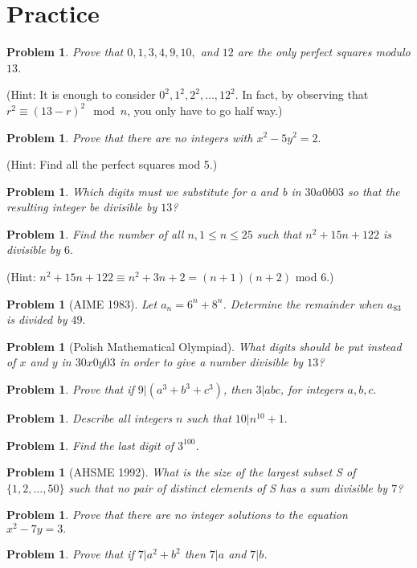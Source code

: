 \documentclass[11pt, openany]{book}
\theoremstyle{change} \theoremheaderfont{\blue\sffamily\bfseries}
\newtheorem{pro}[thm]{Problem}
\theoremstyle{nonumberplain} \theoremheaderfont{\sffamily\bfseries}
\newcommand{\í}{\'{\i}}
\begin{document}
\section*{Practice}\begin{multicols}{2}\columnseprule 1pt \columnsep 25pt

\begin{pro} Prove that $0, 1, 3, 4, 9, 10,$ and $12$ are the only perfect squares
modulo $13$.  \end{pro} (Hint: It is enough to consider $0^2, 1^2,
2^2, \ldots , 12^2$. In fact, by observing that $r^2 \equiv (13 -
r)^2 \mod n$, you only have to go half way.)
\begin{pro} Prove that there are no
integers with $x^2 - 5y^2 = 2.$ \end{pro} (Hint: Find all the
perfect squares mod 5.)
\begin{pro}Which digits must we substitute for a and b in $30a0b03$ so that the resulting
integer be divisible by $13$?\end{pro}

\begin{pro}  Find the number of all $n, 1 \leq n \leq 25$
such that $n^2 + 15n + 122$ is divisible by $6.$
\end{pro}(Hint: $n^2 + 15n + 122 \equiv n^2 + 3n + 2 = (n + 1)(n + 2)$ mod 6.)


\begin{pro}[AIME 1983] Let $a_n = 6^n + 8^n$. Determine the remainder
when $a_{83}$ is divided by $49.$ \end{pro}
\begin{pro}[Polish Mathematical Olympiad] What digits should be put instead of $x$ and $y$
in $30x0y03$ in order to give a number divisible by $13$?\end{pro}
\begin{pro} Prove that if $9|(a^3 + b^3 + c^3)$, then $3|abc$, for
integers $a, b, c.$ \end{pro}
\begin{pro}Describe all integers $n$ such that $10|n^{10} + 1.$\end{pro}
\begin{pro} Find the last digit of $3^{100}$. \end{pro}
\begin{pro}[AHSME 1992] What is the size of the largest
subset S of $\{ 1, 2, \ldots , 50\}$ such that no pair of distinct
elements of S has a sum divisible by $7$?\end{pro}
\begin{pro} Prove that there are no integer solutions to the equation $x^2 - 7y = 3.$ \end{pro}
\begin{pro} Prove that if $7|a^2 + b^2$ then $7|a$ and $7|b$. \end{pro}


\end{multicols}
\end{document}

